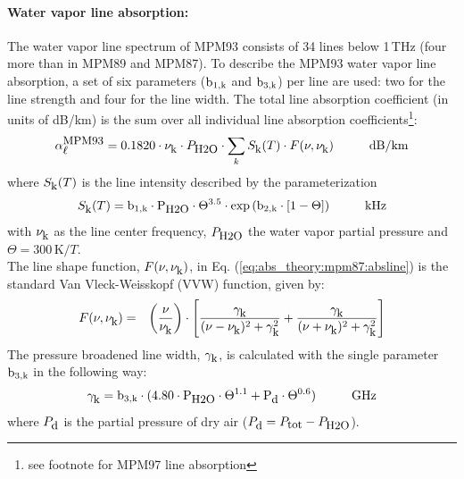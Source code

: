 \paragraph{Water vapor line absorption:}
\label{levele:mpm93_h2olines}
The water vapor line spectrum of MPM93 \citep{liebeetal:93} 
consists of 34 lines below 1\,THz (four more than in MPM89 and MPM87). 
To describe the MPM93 water vapor line absorption, a set of six parameters 
($\rm b_{\rm 1,k}$ and $\rm b_{\rm 3,k}$) per line are used: two for the line strength and 
four for the line width. The total line absorption coefficient 
(in units of dB/km) is the sum over all individual line absorption 
coefficients\footnote{see footnote for MPM97 line absorption}:
\begin{equation}
  \label{eq:abs_theory:mpm93:absline}
  \alphampmnl = 0.1820 \cdot \nuk \cdot \phzo \cdot 
  \sum_{k}{\inten \cdot \shape}\hspace*{10mm}\mbox{dB/km}
\end{equation}
where $S_{\mbox{\rm \small k}}(T)$ is the line intensity described by the parameterization
\begin{equation}
  \label{eq:abs_theory:mpm93:strength}
  \inten = \bek \cdot \phzo \cdot \Theta^{3.5} 
           \cdot \exp{(\bzk \cdot [1-\Theta])}\hspace*{10mm}\mbox{kHz}
\end{equation}
with $\nu_{\mbox{\rm \small k}}$ as the line center frequency, $P_{\mbox{\rm \small H2O}}$ the water
vapor partial pressure and $\Theta = 300\,\mbox{K}/T$.\\
The line shape function, $F(\nu,\nu_{\mbox{\rm \small k}})$, in Eq. (\ref{eq:abs_theory:mpm87:absline}) 
is the standard Van Vleck-Weisskopf (VVW) function, given by:
\begin{eqnarray}
  \label{eq:abs_theory:mpm93:VVW}
  F(\nu,\nu_{\mbox{\rm \small k}}) & = & \left(\frac{\nu}{\nu_{\mbox{\rm \small k}}}\right) \cdot 
               \left[\frac{\gamma_{\mbox{\rm \small k}}}{(\nu - \nu_{\mbox{\rm \small k}})^2 + \gamma_{\mbox{\rm \small k}}^2} + 
                     \frac{\gamma_{\mbox{\rm \small k}}}{(\nu + \nu_{\mbox{\rm \small k}})^2 + \gamma_{\mbox{\rm \small k}}^2}\right]\\
\end{eqnarray}
The pressure broadened line width, $\gamma_{\mbox{\rm \small k}}$, is calculated with the 
single parameter $\rm b_{\rm 3,k}$ in the following way:
\begin{equation}
  \label{eq:abs_theory:mpm93:gamma}
  \gamk = \bdk \cdot 
          (4.80 \cdot \phzo \cdot \Theta^{1.1} + \pda \cdot
          \Theta^{0.6})\hspace*{10mm}\mbox{GHz}
\end{equation}
where $P_{\mbox{\rm \small d}}$ is the partial pressure of dry air ($P_{\mbox{\rm \small d}}=P_{\mbox{\rm \small tot}}-P_{\mbox{\rm \small H2O}}$). 


